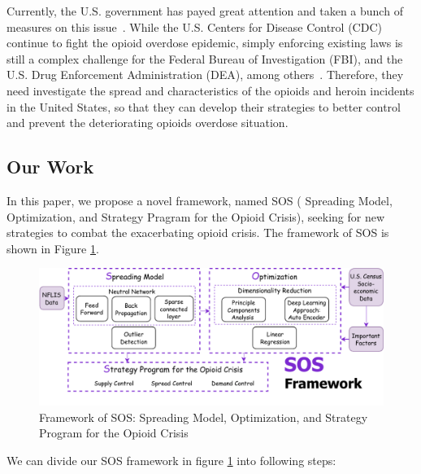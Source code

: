 \documentclass{mcmthesis}
\begin{document}
Currently, the U.S. government has payed great attention and taken a bunch of measures on this issue~\cite{CORRIGAN201844}. While the U.S. Centers for Disease Control (CDC) continue to fight the opioid overdose epidemic, simply enforcing existing laws is still a complex challenge for the Federal Bureau of Investigation (FBI), and the U.S. Drug Enforcement Administration (DEA), among others~\cite{intro}. Therefore, they need investigate the spread and characteristics of the opioids and heroin incidents in the United States, so that they can develop their strategies to better control and prevent the deteriorating opioids overdose situation.

\subsection{Our Work}
In this paper, we propose a novel framework, named SOS ( Spreading Model, Optimization, and Strategy Pragram for the Opioid Crisis), seeking for new strategies to combat the exacerbating opioid crisis. The framework of SOS is shown in Figure \ref{Framework}. 

\begin{figure}[htbp]
	\centering 
	\includegraphics[width=1\linewidth]{../figure/framework2.pdf}  
	\caption{Framework of SOS: Spreading Model, Optimization, and Strategy Program for the Opioid Crisis} 
	\label{Framework}  
\end{figure}


We can divide our SOS framework in figure  \ref{Framework}  into following steps:
\end{document}
